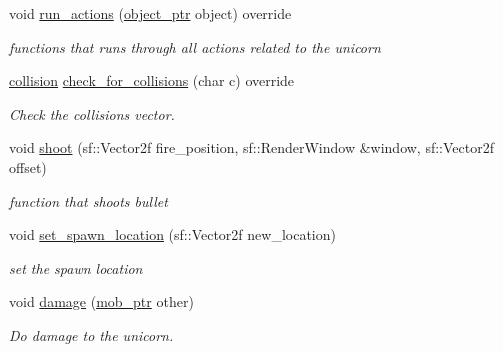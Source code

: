 \begin{DoxyCompactItemize}
void \hyperlink{classunicorn_aadb47a9981c46d6add8704074df117df}{run\+\_\+actions} (\hyperlink{typedefs_8hpp_aab5add95f06d2ba25dbfed8eb07274fa}{object\+\_\+ptr} object) override
\begin{DoxyCompactList}\small\item\em functions that runs through all actions related to the unicorn \end{DoxyCompactList}\item 
\hyperlink{structcollision}{collision} \hyperlink{classunicorn_a40fe782f273abf46f6121db9aa4bf77a}{check\+\_\+for\+\_\+collisions} (char c) override
\begin{DoxyCompactList}\small\item\em Check the collisions vector. \end{DoxyCompactList}\item 
void \hyperlink{classunicorn_af448a3fa5fc5f09254b50afa151ce42b}{shoot} (sf\+::\+Vector2f fire\+\_\+position, sf\+::\+Render\+Window \&window, sf\+::\+Vector2f offset)
\begin{DoxyCompactList}\small\item\em function that shoots bullet \end{DoxyCompactList}\item 
void \hyperlink{classunicorn_af0e2581c426b4b1e32f8a7b484b4e242}{set\+\_\+spawn\+\_\+location} (sf\+::\+Vector2f new\+\_\+location)
\begin{DoxyCompactList}\small\item\em set the spawn location \end{DoxyCompactList}\item 
void \hyperlink{classunicorn_a8b5a22ab1b26daa540ceb09b5b5747d8}{damage} (\hyperlink{typedefs_8hpp_a09ee7f853fc9bc830a9445a06fd53d4b}{mob\+\_\+ptr} other)
\begin{DoxyCompactList}\small\item\em Do damage to the unicorn. \end{DoxyCompactList}\end{DoxyCompactItemize}
